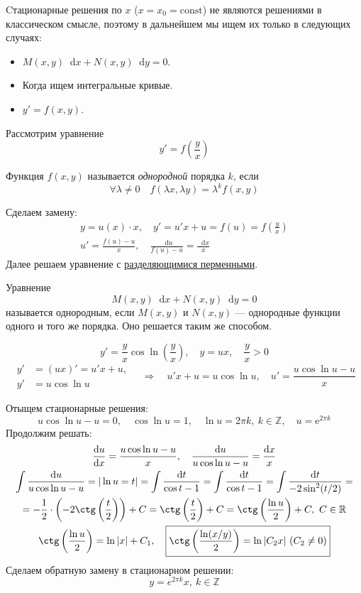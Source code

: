 \documentclass[12pt,a4paper]{article}
\numberwithin{equation}{section}
\newcommand{\R}{\mathbb{R}}
\newcommand{\Z}{\mathbb{Z}}
\newcommand{\e}{\mathrm{e}}
\newcommand{\dd}{\mathop{}\!\mathrm{d}}
\begin{document}
Cтационарные решения по \(x\) (\(x=x_0=\text{const}\)) не являются решениями в классическом смысле, поэтому в дальнейшем мы ищем их только в следующих случаях:

\begin{itemize}
\item \(M(x,y)\dd x+N(x,y)\dd y=0\).
\item Когда ищем интегральные кривые.
\item \(y'=f(x,y)\).
\end{itemize}

\label{box:type3}
\begin{definitionHSE}
Рассмотрим уравнение
\[y'=f\left(\frac{y}{x}\right)\]
\begin{definitionHSE}
Функция \(f(x,y)\) называется \textit{однородной} порядка \(k\), если
\[\forall\lambda\neq0\quad f(\lambda x,\lambda y)=\lambda^kf(x,y)\]
\end{definitionHSE}
Сделаем замену:
\vspace{-\baselineskip}
\begin{gather*}
y=u(x)\cdot x,\quad y'=\boxed{u'x+u=f(u)}=f\left(\frac{y}{x}\right)\\
u'=\frac{f(u)-u}{x},\quad\frac{\dd u}{f(u)-u}=\frac{\dd x}{x}
\end{gather*}
Далее решаем уравнение с \hyperref[box:type1]{разделяющимися перменными}.
\end{definitionHSE}
Уравнение
\[M(x,y)\dd x+N(x,y)\dd y=0\]
называется однородным, если \(M(x,y)\) и \(N(x,y)\) --- однородные функции одного и того же порядка. Оно решается таким же способом.

\begin{exampleHSE}[\(y'=\dfrac{y}{x}\cos\ln\left(\dfrac{y}{x}\right)\)]
\[y'=\frac{y}{x}\cos\ln\left(\frac{y}{x}\right),\quad y=ux,\quad\frac{y}{x}>0\]
\[
\begin{aligned}
y'&=(ux)'=u'x+u,\\
y'&=u\cos\ln u
\end{aligned}\quad\Longrightarrow\quad u'x+u=u\cos\ln u,\quad u'=\frac{u\cos\ln u-u}{x}\]

Отыщем стационарные решения:
\[u\cos\ln u-u=0,\quad\cos\ln u=1,\quad \ln u=2\pi k,\ k\in\Z,\quad u=\e^{2\pi k}\]
Продолжим решать:
\begin{gather*}
\frac{\dd u}{\dd x}=\frac{u\cos\ln u-u}{x},\quad\frac{\dd u}{u\cos\ln u-u}=\frac{\dd x}{x}\\
\int\frac{\dd u}{u\cos\ln u-u}=|\ln u=t|=\int\frac{\dd t}{\cos t-1}=\int\frac{\dd t}{\cos t-1}=\int\frac{\dd t}{-2\sin^2(t/2)}=\\=-\frac{1}{2}\cdot\left(-2\ctg\left(\frac{t}{2}\right)\right)+C=\ctg\left(\frac{t}{2}\right)+C=\ctg\left(\frac{\ln u}{2}\right)+C,\ C\in\R\\
\ctg\left(\frac{\ln u}{2}\right)=\ln|x|+C_1,\quad\boxed{\ctg\left(\frac{\ln (x/y)}{2}\right)=\ln|C_2x|\ (C_2\neq0)}
\end{gather*}
Сделаем обратную замену в стационарном решении:
\[\boxed{y=e^{2\pi k}x,\ k\in\Z}\]
\end{exampleHSE}
\end{document}
